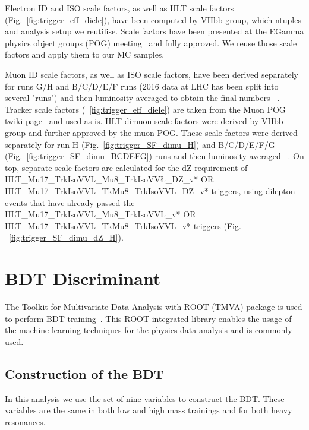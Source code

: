 Electron ID and ISO scale factors, as well as HLT scale factors (Fig.~\ref{fig:trigger_eff_diele}), have been computed by VHbb group, which ntuples and analysis setup we reutilise. Scale factors have been presented at the EGamma physics object groups (POG) meeting~\cite{egSF} and fully approved. We reuse those scale factors and apply them to our MC samples. 

Muon ID scale factors, as well as ISO scale factors, have been derived separately for runs G/H and B/C/D/E/F runs (2016 data at LHC has been split into several "runs") and then luminosity averaged to obtain the final numbers ~\cite{muonIDnISO}. Tracker scale factors (~\ref{fig:trigger_eff_diele}) are taken from the Muon POG twiki page~\cite{muonTRK} and used as is. HLT dimuon scale factors were derived by VHbb group and further approved by the muon POG. These scale factors were derived separately for run H (Fig.~\ref{fig:trigger_SF_dimu_H}) and B/C/D/E/F/G (Fig.~\ref{fig:trigger_SF_dimu_BCDEFG}) runs and then luminosity averaged ~\cite{muonTrigger}. On top, separate scale factors are calculated for the dZ requirement of HLT\_Mu17\_TrkIsoVVL\_Mu8\_TrkIsoVV\L\_DZ\_v* OR HLT\_Mu17\_TrkIsoVVL\_TkMu8\_TrkIsoVVL\_DZ\_v* triggers, using dilepton events that have already passed the HLT\_Mu17\_TrkIsoVVL\_Mu8\_TrkIsoVVL\_v* OR HLT\_Mu17\_TrkIsoVVL\_TkMu8\_TrkIsoVVL\_v* triggers (Fig. ~\ref{fig:trigger_SF_dimu_dZ_H}).



\section{BDT Discriminant}
\label{sec:BDT}

The Toolkit for Multivariate Data Analysis with ROOT (TMVA) package is used to perform BDT training~\cite{Hocker:2007ht}. This ROOT-integrated library enables the usage of the machine learning techniques for the physics data analysis and is commonly used. 

\subsection{Construction of the BDT}
In this analysis we use the set of nine variables to construct the BDT. These variables are the same in both low and high mass trainings and for both heavy resonances.

